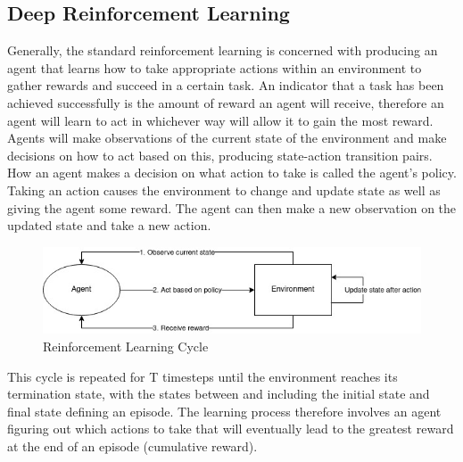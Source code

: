 \documentclass{article}
\begin{document}
\subsection{Deep Reinforcement Learning}
Generally, the standard reinforcement learning is concerned with producing an agent that learns how to take appropriate actions within an environment to gather rewards and succeed in a certain task. An indicator that a task has been achieved successfully is the amount of reward an agent will receive, therefore an agent will learn to act in whichever way will allow it to gain the most reward. Agents will make observations of the current state of the environment and make decisions on how to act based on this, producing state-action transition pairs. How an agent makes a decision on what action to take is called the agent’s policy. Taking an action causes the environment to change and update state as well as giving the agent some reward. The agent can then make a new observation on the updated state and take a new action.

\begin{figure}[H]
\centering
\includegraphics[scale=0.5]{RLCycle}
\caption{Reinforcement Learning Cycle}
\label{rlcyclefig}
\end{figure}

This cycle is repeated for T timesteps until the environment reaches its termination state, with the states between and including the initial state and final state defining an episode. The learning process therefore involves an agent figuring out which actions to take that will eventually lead to the greatest reward at the end of an episode (cumulative reward).
\end{document}
